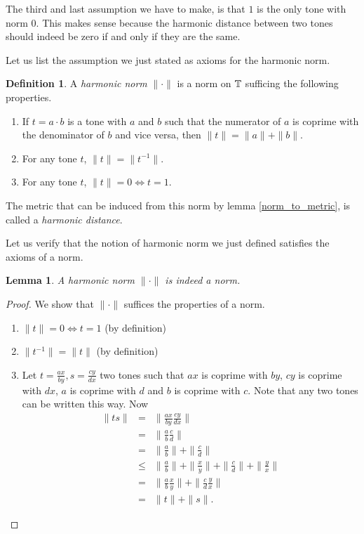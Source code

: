 \documentclass[a4paper]{book}
\newtheorem{lemma}[theorem]{Lemma}
\theoremstyle{definition}
\newtheorem{definition}[theorem]{Definition}
\begin{document}
The third and last assumption we have to make, is that $1$ is the only tone with norm $0$.
This makes sense because the harmonic distance between two tones should indeed be zero if and only if they are the same.

Let us list the assumption we just stated as axioms for the harmonic norm.
\begin{definition}
    A \emph{harmonic norm} $\| \cdot \|$ is a norm on $\mathbb{T}$ sufficing the following properties.
    \begin{enumerate}[i]
        \item If $t = a \cdot b$ is a tone with $a$ and $b$ such that the numerator of $a$ is coprime with the denominator of $b$ and vice versa, then $\|t\| = \|a\|+\|b\|$.
        \item For any tone $t$, $\|t\| = \|t^{-1}\|$.
        \item For any tone $t$, $\|t\| = 0 \Leftrightarrow t = 1$.
    \end{enumerate}
    The metric that can be induced from this norm by lemma \ref{norm_to_metric}, is called a \emph{harmonic distance}.
\end{definition}

Let us verify that the notion of harmonic norm we just defined satisfies the axioms of a norm.

\begin{lemma}
    A harmonic norm $\| \cdot \|$ is indeed a norm.
\end{lemma}
\begin{proof}
    We show that $\| \cdot \|$ suffices the properties of a norm.
    \begin{enumerate}[i]
        \item $\|t\| = 0 \Leftrightarrow t = 1$ (by definition)
        \item $\|t^{-1}\| = \|t\|$ (by definition)
        \item Let $t = \frac{ax}{by},s = \frac{cy}{dx}$ two tones such that $ax$ is coprime with $by$, $cy$ is coprime with $dx$, $a$ is coprime with $d$ and $b$ is coprime with $c$.
            Note that any two tones can be written this way. 
            Now 
    \begin{eqnarray*}
            \|ts\| &=& \|\frac{ax}{by} \frac{cy}{dx}\|  \\
            &=& \|\frac{a}{b} \frac{c}{d}\| \\
            &=& \|\frac{a}{b}\| + \|\frac{c}{d}\|  \\
            &\leq& \|\frac{a}{b}\| + \|\frac{x}{y}\| + \|\frac{c}{d}\| + \|\frac{y}{x}\|  \\
            &=& \|\frac{a}{b}\frac{x}{y}\| + \|\frac{c}{d}\frac{y}{x}\|  \\
            &=& \|t\| + \|s\|.
    \end{eqnarray*}
    \end{enumerate}
\end{proof}
\end{document}
